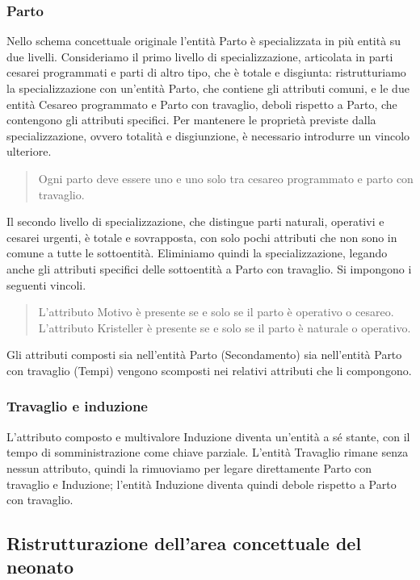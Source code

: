 \subsubsection{Parto}

Nello schema concettuale originale l'entità Parto è specializzata in più entità su due livelli.
Consideriamo il primo livello di specializzazione, articolata in parti cesarei programmati e parti di altro tipo, che è totale e disgiunta: ristrutturiamo la specializzazione con un'entità Parto, che contiene gli attributi comuni, e le due entità Cesareo programmato e Parto con travaglio, deboli rispetto a Parto, che contengono gli attributi specifici.
Per mantenere le proprietà previste dalla specializzazione, ovvero totalità e disgiunzione, è necessario introdurre un vincolo ulteriore.
\begin{quote}
Ogni parto deve essere uno e uno solo tra cesareo programmato e parto con travaglio.
\end{quote}

Il secondo livello di specializzazione, che distingue parti naturali, operativi e cesarei urgenti, è totale e sovrapposta, con solo pochi attributi che non sono in comune a tutte le sottoentità.
Eliminiamo quindi la specializzazione, legando anche gli attributi specifici delle sottoentità a Parto con travaglio.
Si impongono i seguenti vincoli.
\begin{quote}
L'attributo Motivo è presente se e solo se il parto è operativo o cesareo.
L'attributo Kristeller è presente se e solo se il parto è naturale o operativo.
\end{quote}

Gli attributi composti sia nell'entità Parto (Secondamento) sia nell'entità Parto con travaglio (Tempi) vengono scomposti nei relativi attributi che li compongono.

\subsubsection{Travaglio e induzione}

L'attributo composto e multivalore Induzione diventa un'entità a sé stante, con il tempo di somministrazione come chiave parziale.
L'entità Travaglio rimane senza nessun attributo, quindi la rimuoviamo per legare direttamente Parto con travaglio e Induzione; l'entità Induzione diventa quindi debole rispetto a Parto con travaglio.

\subsection{Ristrutturazione dell'area concettuale del neonato}

